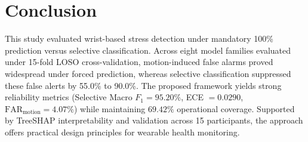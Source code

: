 \documentclass[conference]{IEEEtran}
\begin{document}
\section{Conclusion}
This study evaluated wrist-based stress detection under mandatory 100\% prediction versus selective classification. Across eight model families evaluated under 15-fold LOSO cross-validation, motion-induced false alarms proved widespread under forced prediction, whereas selective classification suppressed these false alerts by 55.0\% to 90.0\%. The proposed framework yields strong reliability metrics (Selective Macro $F_1 = 95.20\%$, ECE $= 0.0290$, $\text{FAR}_{\text{motion}} = 4.07\%$) while maintaining $69.42\%$ operational coverage. Supported by TreeSHAP interpretability and validation across 15 participants, the approach offers practical design principles for wearable health monitoring.
\end{document}
